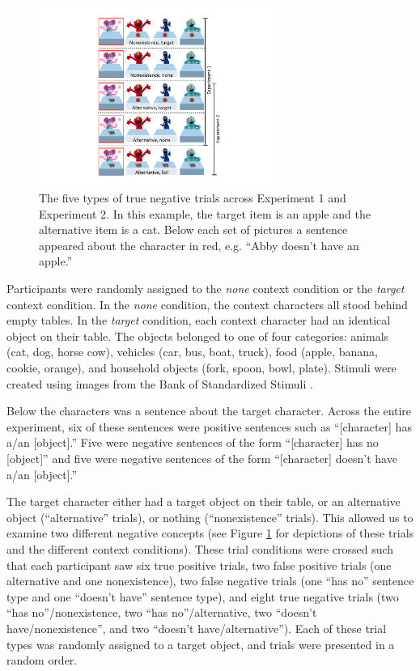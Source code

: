 \documentclass[10pt,letterpaper]{article}
\begin{document}
\begin{figure}[t]
\begin{center} 
\includegraphics[width=3in]{figures/trialtypes.pdf}
\caption{\label{fig:trial} The five types of true negative trials across Experiment 1 and Experiment 2.  In this example, the target item is an apple and the alternative item is a cat. Below each set of pictures a sentence appeared about the character in red, e.g. ``Abby doesn't have an apple.''}  
\end{center} 
\end{figure}

Participants were randomly assigned to the \emph{none} context condition or the \emph{target} context condition.  In the \emph{none} condition, the context characters all stood behind empty tables.  In the \emph{target} condition, each context character had an identical object on their table.  The objects belonged to one of four categories: animals (cat, dog, horse cow), vehicles (car, bus, boat, truck), food (apple, banana, cookie, orange), and household objects (fork, spoon, bowl, plate).  Stimuli were created using images from the Bank of Standardized Stimuli \cite{brodeur2010}.  

Below the characters was a sentence about the target character.  Across the entire experiment, six of these sentences were positive sentences such as ``[character] has a/an [object].''  Five were negative sentences of the form ``[character] has no [object]'' and five were negative sentences of the form ``[character] doesn't have a/an [object].'' 

The target character either had a target object on their table, or an alternative object (``alternative'' trials), or nothing (``nonexistence'' trials).  This allowed us to examine two different negative concepts (see Figure \ref{fig:trial} for depictions of these trials and the different context conditions).    These trial conditions were crossed such that each participant saw six true positive trials, two false positive trials (one alternative and one nonexistence), two false negative trials (one ``has no'' sentence type and one ``doesn't have'' sentence type), and eight true negative trials (two ``has no''/nonexistence, two ``has no''/alternative, two ``doesn't have/nonexistence'', and two ``doesn't have/alternative'').  Each of these trial types was randomly assigned to a target object, and trials were presented in a random order.  
\end{document}
